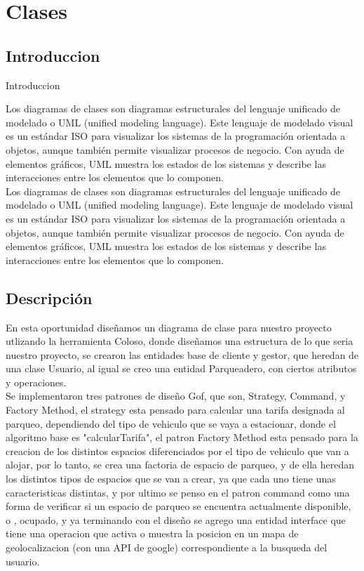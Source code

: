 \chapter{Clases}
\section{Introduccion}
\begin{center}
Introduccion
\end{center}

\begin{flushleft}
Los diagramas de clases son diagramas estructurales del lenguaje unificado de modelado o UML (unified modeling language). Este lenguaje de modelado visual es un estándar ISO para visualizar los sistemas de la programación orientada a objetos, aunque también permite visualizar procesos de negocio. Con ayuda de elementos gráficos, UML muestra los estados de los sistemas y describe las interacciones entre los elementos que lo componen.
\\ 
Los diagramas de clases son diagramas estructurales del lenguaje unificado de modelado o UML (unified modeling language). Este lenguaje de modelado visual es un estándar ISO para visualizar los sistemas de la programación orientada a objetos, aunque también permite visualizar procesos de negocio. Con ayuda de elementos gráficos, UML muestra los estados de los sistemas y describe las interacciones entre los elementos que lo componen.
\end{flushleft}
\newpage
\section{Descripción}
\begin{flushleft}En esta oportunidad diseñamos un diagrama de clase para nuestro proyecto utlizando la herramienta Coloso, donde diseñamos una estructura de lo que seria nuestro proyecto,	se crearon las entidades base de cliente y gestor, que heredan de una clase Usuario, al igual se creo una entidad Parqueadero, con ciertos atributos y operaciones.
	\\Se implementaron tres patrones de diseño Gof, que son, Strategy, Command, y Factory Method, el strategy esta pensado para calcular una tarifa designada al parqueo, dependiendo del tipo de vehiculo que se vaya a estacionar, donde el algoritmo base es "calcularTarifa", el patron Factory Method esta pensado para la creacion de los distintos espacios diferenciados por el tipo de vehiculo que van a alojar, por lo tanto, se crea una factoria de espacio de parqueo, y de ella heredan los distintos tipos de espacios que se van a crear, ya que cada uno tiene unas caracteristicas distintas, y por ultimo se penso en el patron command como una forma de verificar si un espacio de parqueo se encuentra actualmente disponible, o , ocupado, y ya terminando con el diseño se agrego una entidad interface que tiene una operacion que activa o muestra la posicion en un mapa de geolocalizacion (con una API de google) correspondiente a la busqueda del usuario. \end{flushleft}

